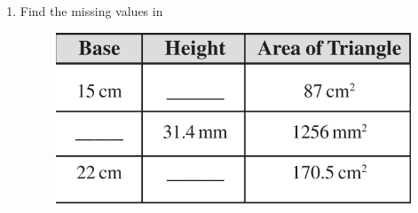 \begin{enumerate}[label=\thesection.\arabic*,ref=\thesection.\theenumi,resume*]
\begin{figure}[H]
  \caption{}
  \label{fig:area}
\end{figure}
\item	Find the missing values
	in
	\begin{figure}[H]
  \centering
  \includegraphics[width=\columnwidth]{figs/area1.jpg}
  \caption{}
  \label{fig:area1}
\end{figure}
\end{enumerate}
